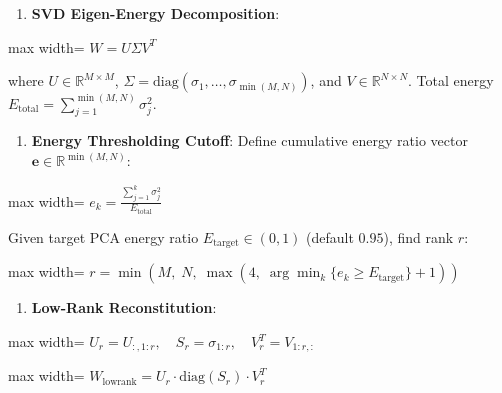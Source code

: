 \begin{enumerate}
\item \textbf{SVD Eigen-Energy Decomposition}:
\end{enumerate}
\begin{center}
\begin{adjustbox}{max width=\columnwidth}
$\displaystyle
W = U \Sigma V^T
$
\end{adjustbox}
\end{center}
where $U \in \mathbb{R}^{M \times M}$, $\Sigma = \text{diag}(\sigma_1, \dots, \sigma_{\min(M, N)})$, and $V \in \mathbb{R}^{N \times N}$.
Total energy $E_{\text{total}} = \sum_{j=1}^{\min(M, N)} \sigma_j^2$.

\begin{enumerate}
\item \textbf{Energy Thresholding Cutoff}:
Define cumulative energy ratio vector $\mathbf{e} \in \mathbb{R}^{\min(M, N)}$:
\end{enumerate}
\begin{center}
\begin{adjustbox}{max width=\columnwidth}
$\displaystyle
e_k = \frac{\sum_{j=1}^k \sigma_j^2}{E_{\text{total}}}
$
\end{adjustbox}
\end{center}
Given target PCA energy ratio $E_{\text{target}} \in (0, 1)$ (default $0.95$), find rank $r$:
\begin{center}
\begin{adjustbox}{max width=\columnwidth}
$\displaystyle
r = \min\left( M, \; N, \; \max\left( 4, \; \arg\min_k \{ e_k \ge E_{\text{target}} \} + 1 \right) \right)
$
\end{adjustbox}
\end{center}

\begin{enumerate}
\item \textbf{Low-Rank Reconstitution}:
\end{enumerate}
\begin{center}
\begin{adjustbox}{max width=\columnwidth}
$\displaystyle
U_r = U_{:, 1:r}, \quad S_r = \sigma_{1:r}, \quad V_r^T = V_{1:r, :}
$
\end{adjustbox}
\end{center}
\begin{center}
\begin{adjustbox}{max width=\columnwidth}
$\displaystyle
W_{\text{lowrank}} = U_r \cdot \text{diag}(S_r) \cdot V_r^T
$
\end{adjustbox}
\end{center}

